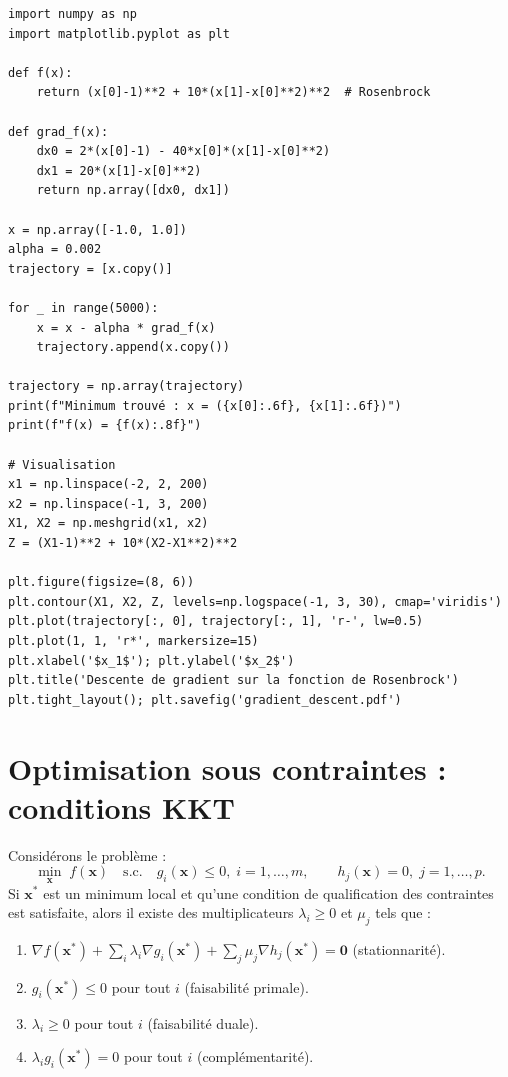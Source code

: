 \begin{codeblock}[title=\textbf{Descente de gradient en Python}]
\begin{verbatim}
import numpy as np
import matplotlib.pyplot as plt

def f(x):
    return (x[0]-1)**2 + 10*(x[1]-x[0]**2)**2  # Rosenbrock

def grad_f(x):
    dx0 = 2*(x[0]-1) - 40*x[0]*(x[1]-x[0]**2)
    dx1 = 20*(x[1]-x[0]**2)
    return np.array([dx0, dx1])

x = np.array([-1.0, 1.0])
alpha = 0.002
trajectory = [x.copy()]

for _ in range(5000):
    x = x - alpha * grad_f(x)
    trajectory.append(x.copy())

trajectory = np.array(trajectory)
print(f"Minimum trouvé : x = ({x[0]:.6f}, {x[1]:.6f})")
print(f"f(x) = {f(x):.8f}")

# Visualisation
x1 = np.linspace(-2, 2, 200)
x2 = np.linspace(-1, 3, 200)
X1, X2 = np.meshgrid(x1, x2)
Z = (X1-1)**2 + 10*(X2-X1**2)**2

plt.figure(figsize=(8, 6))
plt.contour(X1, X2, Z, levels=np.logspace(-1, 3, 30), cmap='viridis')
plt.plot(trajectory[:, 0], trajectory[:, 1], 'r-', lw=0.5)
plt.plot(1, 1, 'r*', markersize=15)
plt.xlabel('$x_1$'); plt.ylabel('$x_2$')
plt.title('Descente de gradient sur la fonction de Rosenbrock')
plt.tight_layout(); plt.savefig('gradient_descent.pdf')
\end{verbatim}
\end{codeblock}

\section{Optimisation sous contraintes : conditions KKT}
\label{sec:kkt}

\begin{theoreme}
Consid\'erons le probl\`eme :
\[
  \min_{\mathbf{x}}\;f(\mathbf{x})
  \quad\text{s.c.}\quad
  g_i(\mathbf{x})\leq 0,\;i=1,\ldots,m, \qquad
  h_j(\mathbf{x})=0,\;j=1,\ldots,p.
\]
Si $\mathbf{x}^*$ est un minimum local et qu'une condition de
qualification des contraintes est satisfaite, alors il existe
des multiplicateurs $\lambda_i\geq 0$ et $\mu_j$ tels que :
\begin{enumerate}
  \item $\nabla f(\mathbf{x}^*) + \sum_i\lambda_i\nabla g_i(\mathbf{x}^*)
    + \sum_j\mu_j\nabla h_j(\mathbf{x}^*) = \mathbf{0}$ (stationnarit\'e).
  \item $g_i(\mathbf{x}^*)\leq 0$ pour tout $i$ (faisabilit\'e primale).
  \item $\lambda_i\geq 0$ pour tout $i$ (faisabilit\'e duale).
  \item $\lambda_i g_i(\mathbf{x}^*)=0$ pour tout $i$
    (compl\'ementarit\'e).
\end{enumerate}
\end{theoreme}

